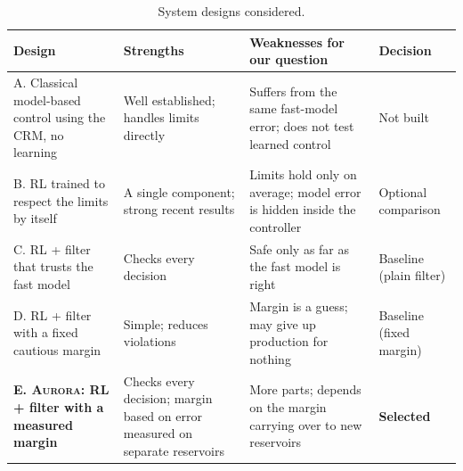 \documentclass[11pt,letterpaper]{article}
\newcommand{\aur}{\textsc{Aurora}}
\begin{document}
\begin{table}[!htbp]
\caption{System designs considered.}\label{tab:altsys}
\small
\begin{tabularx}{\textwidth}{@{}P{3.6cm}LLP{1.9cm}@{}}
\toprule
\textbf{Design} & \textbf{Strengths} & \textbf{Weaknesses for our question} & \textbf{Decision} \\
\midrule
A. Classical model-based control using the CRM, no learning & Well established; handles limits directly & Suffers from the same fast-model error; does not test learned control & Not built \\
B. RL trained to respect the limits by itself & A single component; strong recent results \cite{chen2025wcsac,achiam2017cpo} & Limits hold only on average; model error is hidden inside the controller & Optional comparison \\
C. RL + filter that trusts the fast model & Checks every decision & Safe only as far as the fast model is right & Baseline (plain filter) \\
D. RL + filter with a fixed cautious margin & Simple; reduces violations & Margin is a guess; may give up production for nothing & Baseline (fixed margin) \\
\textbf{E. \aur{}: RL + filter with a measured margin} & Checks every decision; margin based on error measured on separate reservoirs & More parts; depends on the margin carrying over to new reservoirs & \textbf{Selected} \\
\bottomrule
\end{tabularx}
\end{table}
\end{document}
